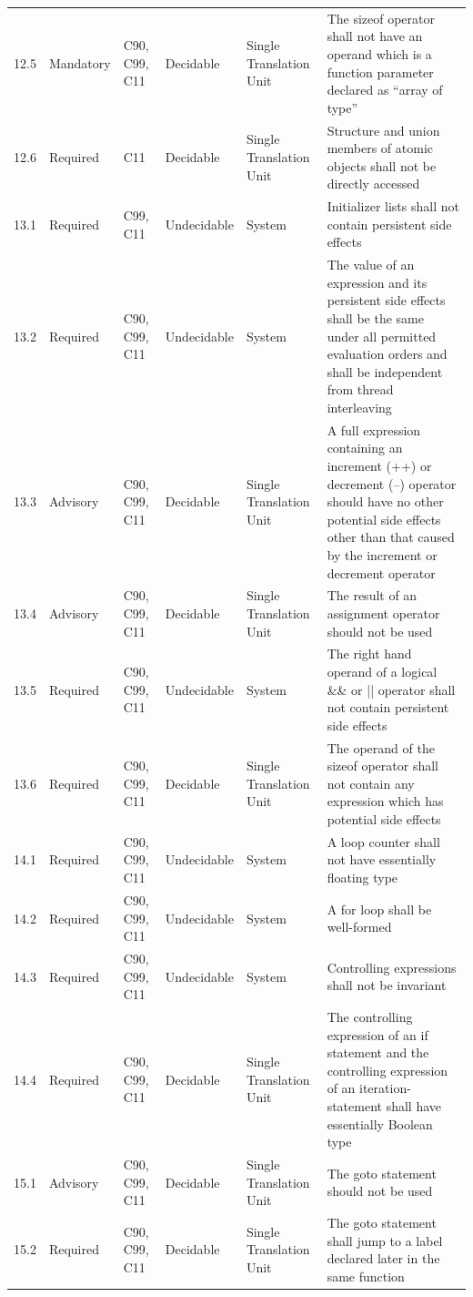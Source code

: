 \documentclass[11pt]{article}
\begin{document}
{\begin{longtable}{@{}p{1.0cm}p{1.6cm}p{1.8cm}p{2.0cm}p{1.6cm}p{7.4cm}@{}}
12.5 & Mandatory & C90, C99, C11 & Decidable & Single Translation Unit & The sizeof operator shall not have an operand which is a function parameter declared as ``array of type'' \\
12.6 & Required & C11 & Decidable & Single Translation Unit & Structure and union members of atomic objects shall not be directly accessed \\
13.1 & Required & C99, C11 & Undecidable & System & Initializer lists shall not contain persistent side effects \\
13.2 & Required & C90, C99, C11 & Undecidable & System & The value of an expression and its persistent side effects shall be the same under all permitted evaluation orders and shall be independent from thread interleaving \\
13.3 & Advisory & C90, C99, C11 & Decidable & Single Translation Unit & A full expression containing an increment (++) or decrement (--) operator should have no other potential side effects other than that caused by the increment or decrement operator \\
13.4 & Advisory & C90, C99, C11 & Decidable & Single Translation Unit & The result of an assignment operator should not be used \\
13.5 & Required & C90, C99, C11 & Undecidable & System & The right hand operand of a logical \&\& or || operator shall not contain persistent side effects \\
13.6 & Required & C90, C99, C11 & Decidable & Single Translation Unit & The operand of the sizeof operator shall not contain any expression which has potential side effects \\
14.1 & Required & C90, C99, C11 & Undecidable & System & A loop counter shall not have essentially floating type \\
14.2 & Required & C90, C99, C11 & Undecidable & System & A for loop shall be well-formed \\
14.3 & Required & C90, C99, C11 & Undecidable & System & Controlling expressions shall not be invariant \\
14.4 & Required & C90, C99, C11 & Decidable & Single Translation Unit & The controlling expression of an if statement and the controlling expression of an iteration-statement shall have essentially Boolean type \\
15.1 & Advisory & C90, C99, C11 & Decidable & Single Translation Unit & The goto statement should not be used \\
15.2 & Required & C90, C99, C11 & Decidable & Single Translation Unit & The goto statement shall jump to a label declared later in the same function \\

\end{longtable}}
\end{document}
